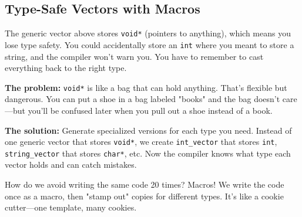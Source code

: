 \subsection{Type-Safe Vectors with Macros}

The generic vector above stores \texttt{void*} (pointers to anything), which means you lose type safety. You could accidentally store an \texttt{int} where you meant to store a string, and the compiler won't warn you. You have to remember to cast everything back to the right type.

\textbf{The problem:} \texttt{void*} is like a bag that can hold anything. That's flexible but dangerous. You can put a shoe in a bag labeled "books" and the bag doesn't care—but you'll be confused later when you pull out a shoe instead of a book.

\textbf{The solution:} Generate specialized versions for each type you need. Instead of one generic vector that stores \texttt{void*}, we create \texttt{int\_vector} that stores \texttt{int}, \texttt{string\_vector} that stores \texttt{char*}, etc. Now the compiler knows what type each vector holds and can catch mistakes.

How do we avoid writing the same code 20 times? Macros! We write the code once as a macro, then "stamp out" copies for different types. It's like a cookie cutter—one template, many cookies.

